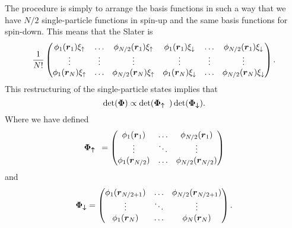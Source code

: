         The procedure is simply to arrange the basis functions in such a way
        that we have $N/2$ single-particle functions in spin-up and the same
        basis functions for spin-down. This means that the Slater is
            \begin{equation}
                \frac{1}{N!} \begin{pmatrix}
                    \phi_1(\boldsymbol{{r}}_1)\xi_{\uparrow} & \dots &
                    \phi_{N/2}(\boldsymbol{{r}}_1)\xi_{\uparrow} &
                    \phi_1(\boldsymbol{{r}}_1)\xi_{\downarrow} & \dots &
                    \phi_{N/2}(\boldsymbol{{r}}_1)\xi_{\downarrow} \\
                    \vdots & \vdots & \vdots & \vdots & \vdots & \vdots \\
                    \phi_1(\boldsymbol{{r}}_N)\xi_{\uparrow} & \dots &
                    \phi_{N/2}(\boldsymbol{{r}}_N)\xi_{\uparrow} &
                    \phi_1(\boldsymbol{{r}}_N)\xi_{\downarrow} & \dots &
                    \phi_{N/2}(\boldsymbol{{r}}_N)\xi_{\downarrow}
                \end{pmatrix}.
            \end{equation}
        This restructuring of the single-particle states implies that
            \begin{equation}
                \det(\boldsymbol{{\Phi}}) \propto \det(\boldsymbol{{\Phi_{\uparrow}}})
                \det(\boldsymbol{{\Phi_{\downarrow}}}).
            \end{equation}
        Where we have defined
            \begin{equation}
                    \boldsymbol{{\Phi_{\uparrow}}} = \begin{pmatrix}
                        \phi_1(\boldsymbol{{r}}_1) & \dots & \phi_{N/2}(\boldsymbol{{r}}_1) \\
                        \vdots & \ddots & \vdots \\
                        \phi_1(\boldsymbol{{r}}_{N/2}) & \dots &
                        \phi_{N/2}(\boldsymbol{{r}}_{N/2})
                    \end{pmatrix}
            \end{equation}
        and
            \begin{equation}
                \boldsymbol{{\Phi_{\downarrow}}} = \begin{pmatrix}
                    \phi_1(\boldsymbol{{r}}_{N/2+1}) & \dots &
                    \phi_{N/2}(\boldsymbol{{r}}_{N/2+1}) \\
                    \vdots & \ddots & \vdots \\
                    \phi_1(\boldsymbol{{r}}_{N}) & \dots & \phi_{N}(\boldsymbol{{r}}_{N})
                \end{pmatrix}.
            \end{equation}
